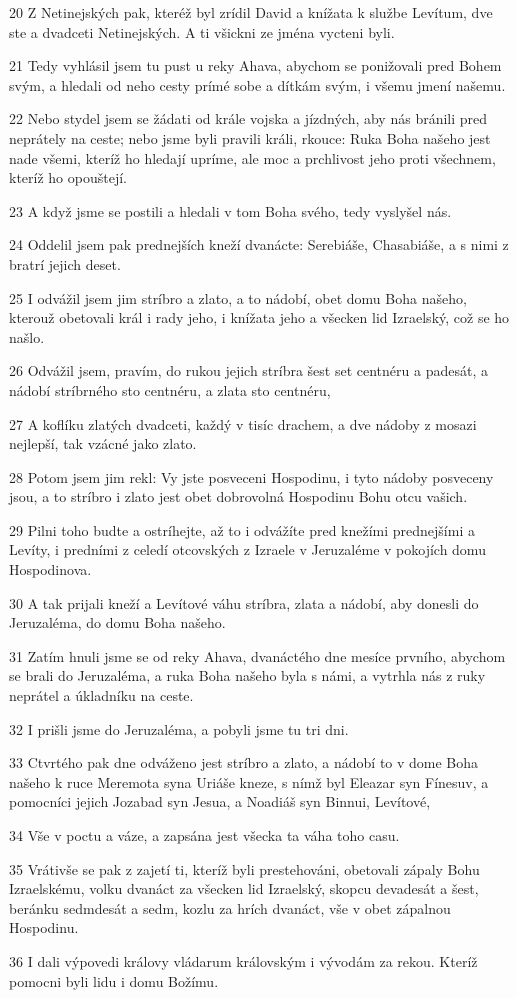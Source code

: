 \par 20 Z Netinejských pak, kteréž byl zrídil David a knížata k službe Levítum, dve ste a dvadceti Netinejských. A ti všickni ze jména vycteni byli.
\par 21 Tedy vyhlásil jsem tu pust u reky Ahava, abychom se ponižovali pred Bohem svým, a hledali od neho cesty prímé sobe a dítkám svým, i všemu jmení našemu.
\par 22 Nebo stydel jsem se žádati od krále vojska a jízdných, aby nás bránili pred neprátely na ceste; nebo jsme byli pravili králi, rkouce: Ruka Boha našeho jest nade všemi, kteríž ho hledají upríme, ale moc a prchlivost jeho proti všechnem, kteríž ho opouštejí.
\par 23 A když jsme se postili a hledali v tom Boha svého, tedy vyslyšel nás.
\par 24 Oddelil jsem pak prednejších kneží dvanácte: Serebiáše, Chasabiáše, a s nimi z bratrí jejich deset.
\par 25 I odvážil jsem jim stríbro a zlato, a to nádobí, obet domu Boha našeho, kterouž obetovali král i rady jeho, i knížata jeho a všecken lid Izraelský, což se ho našlo.
\par 26 Odvážil jsem, pravím, do rukou jejich stríbra šest set centnéru a padesát, a nádobí stríbrného sto centnéru, a zlata sto centnéru,
\par 27 A koflíku zlatých dvadceti, každý v tisíc drachem, a dve nádoby z mosazi nejlepší, tak vzácné jako zlato.
\par 28 Potom jsem jim rekl: Vy jste posveceni Hospodinu, i tyto nádoby posveceny jsou, a to stríbro i zlato jest obet dobrovolná Hospodinu Bohu otcu vašich.
\par 29 Pilni toho budte a ostríhejte, až to i odvážíte pred knežími prednejšími a Levíty, i predními z celedí otcovských z Izraele v Jeruzaléme v pokojích domu Hospodinova.
\par 30 A tak prijali kneží a Levítové váhu stríbra, zlata a nádobí, aby donesli do Jeruzaléma, do domu Boha našeho.
\par 31 Zatím hnuli jsme se od reky Ahava, dvanáctého dne mesíce prvního, abychom se brali do Jeruzaléma, a ruka Boha našeho byla s námi, a vytrhla nás z ruky neprátel a úkladníku na ceste.
\par 32 I prišli jsme do Jeruzaléma, a pobyli jsme tu tri dni.
\par 33 Ctvrtého pak dne odváženo jest stríbro a zlato, a nádobí to v dome Boha našeho k ruce Meremota syna Uriáše kneze, s nímž byl Eleazar syn Fínesuv, a pomocníci jejich Jozabad syn Jesua, a Noadiáš syn Binnui, Levítové,
\par 34 Vše v poctu a váze, a zapsána jest všecka ta váha toho casu.
\par 35 Vrátivše se pak z zajetí ti, kteríž byli prestehováni, obetovali zápaly Bohu Izraelskému, volku dvanáct za všecken lid Izraelský, skopcu devadesát a šest, beránku sedmdesát a sedm, kozlu za hrích dvanáct, vše v obet zápalnou Hospodinu.
\par 36 I dali výpovedi královy vládarum královským i vývodám za rekou. Kteríž pomocni byli lidu i domu Božímu.

